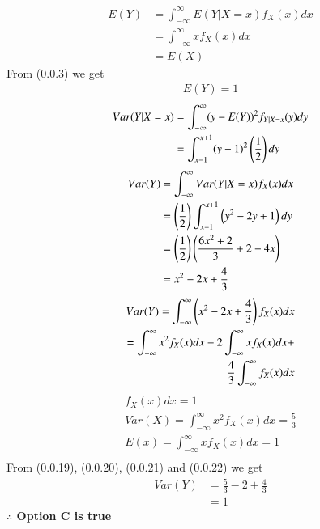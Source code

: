 \documentclass[journal,12pt,twocolumn]{IEEEtran}
\begin{document}
\begin{align}
    E(Y)&=\int_{-\infty}^{\infty}E(Y|X=x)f_{X}(x)dx\\
    &=\int_{-\infty}^{\infty}xf_{X}(x)dx\\
    &=E(X)
\end{align}
From (0.0.3) we get 
\begin{align}
    E(Y)=1
\end{align}
\begin{align}
    Var(Y|X=x)&=\int_{-\infty}^{\infty}(y-E(Y))^2f_{Y|X=x}(y)dy\\
    &=\int_{x-1}^{x+1}(y-1)^2\left(\frac{1}{2}\right)dy
\end{align}
\begin{align}
    Var(Y)&=\int_{-\infty}^{\infty}Var(Y|X=x)f_{X}(x)dx\\
    &=\left(\frac{1}{2}\right)\int_{x-1}^{x+1}\left(y^2-2y+1\right)dy\\
    &=\left(\frac{1}{2}\right)\left(\frac{6x^2+2}{3}+2-4x\right)\\
    &=x^2-2x+\frac{4}{3}
\end{align}
\begin{align}
  Var(Y)=\int_{-\infty}^{\infty}\left(x^2-2x+\frac{4}{3}\right)f_{X}(x)dx\\
   =\int_{-\infty}^{\infty}x^2f_{X}(x)dx-2\int_{-\infty}^{\infty}xf_{X}(x)dx+\\\frac{4}{3}\int_{-\infty}^{\infty}f_{X}(x)dx
 \end{align}
\begin{align}
  f_{X}(x)dx=1\\
 Var(X)=\int_{-\infty}^{\infty}x^2f_{X}(x)dx=\frac{5}{3}\\
 E(x)=\int_{-\infty}^{\infty}xf_{X}(x)dx=1\\
 \end{align}
 From (0.0.19), (0.0.20), (0.0.21) and (0.0.22) we get
 \begin{align}
     Var(Y)&=\frac{5}{3}-2+\frac{4}{3}\\
     &=1
 \end{align}
\textbf{$\therefore$ Option C is true}
\end{document}
